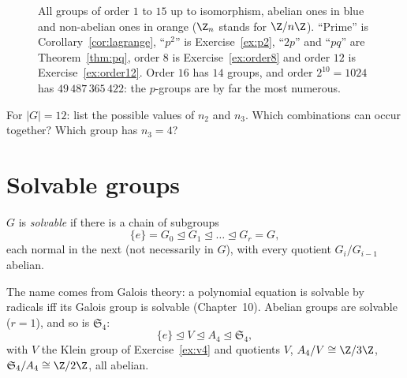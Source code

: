 \begin{figure}[ht]
\centering
{}
\caption{All groups of order $1$ to $15$ up to isomorphism, abelian ones in blue and non-abelian ones in orange ($\Z_n$ stands for $\Z/n\Z$). ``Prime'' is Corollary~\ref{cor:lagrange}, ``$p^2$'' is Exercise~\ref{ex:p2}, ``$2p$'' and ``$pq$'' are Theorem~\ref{thm:pq}, order $8$ is Exercise~\ref{ex:order8} and order $12$ is Exercise~\ref{ex:order12}. Order $16$ has $14$ groups, and order $2^{10}=1024$ has $49\,487\,365\,422$: the $p$-groups are by far the most numerous.}
\label{fig:small}
\end{figure}

\begin{think}
For $|G|=12$: list the possible values of $n_2$ and $n_3$. Which combinations can occur together? Which group has $n_3=4$?
\end{think}

\section{Solvable groups}

\begin{definition}
$G$ is \emph{solvable} if there is a chain of subgroups
\[
\{e\}=G_0\trianglelefteq G_1\trianglelefteq\dots\trianglelefteq G_r=G,
\]
each normal in the next (not necessarily in $G$), with every quotient $G_i/G_{i-1}$ abelian.
\end{definition}

The name comes from Galois theory: a polynomial equation is solvable by radicals iff its Galois group is solvable (Chapter~10). Abelian groups are solvable ($r=1$), and so is $\mathfrak S_4$:
\[
\{e\}\trianglelefteq V\trianglelefteq A_4\trianglelefteq\mathfrak S_4,
\]
with $V$ the Klein group of Exercise~\ref{ex:v4} and quotients $V$, $A_4/V\cong\Z/3\Z$, $\mathfrak S_4/A_4\cong\Z/2\Z$, all abelian.

